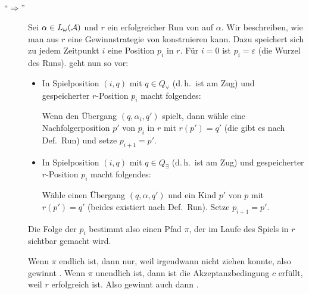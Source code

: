 \documentclass[fontsize=11pt, twoside=false, numbers=autoenddot]{scrbook}
\begin{document}
\parII
{}~
%
\begin{description}
  \item[{\boldmath "`$\Rightarrow$"'}]
    Sei $\alpha \in L_\omega(\mathcal{A})$ und $r$ ein erfolgreicher Run von \Amc auf $\alpha$.
    Wir beschreiben, wie man aus $r$ eine Gewinnstrategie von \PlE konstruieren kann.
    Dazu speichert sich \PlE zu jedem Zeitpunkt $i$ eine Position $p_i$ in $r$.
    Für $i=0$ ist $p_i = \varepsilon$ (die Wurzel des Runs).
    \PlE geht nun so vor:
    \begin{itemize}
      \item
        In Spielposition $(i,q)$ mit $q \in Q_\forall$ (d.\,h.\ \PlA ist am Zug)
        und gespeicherter $r$-Position $p_i$ macht \PlE folgendes:
        
        Wenn \PlA den Übergang $(q,\alpha_i,q')$ spielt,
        dann wähle eine Nachfolgerposition $p'$ von $p_i$ in $r$
        mit $r(p') = q'$ (die gibt es nach Def.\ Run)
        und setze $p_{i+1} = p'$.
      \item
        In Spielposition $(i,q)$ mit $q \in Q_\exists$ (d.\,h.\ \PlE ist am Zug)
        und gespeicherter $r$-Position $p_i$ macht \PlE folgendes:
        
        Wähle einen Übergang $(q,\alpha,q')$ und ein Kind $p'$ von $p$
        mit $r(p')=q'$ (beides existiert nach Def.\ Run).
        Setze $p_{i+1} = p'$.
    \end{itemize}
    Die Folge der $p_i$ bestimmt also einen Pfad $\pi$,
    der im Laufe des Spiels in $r$ sichtbar gemacht wird.
    
    Wenn $\pi$ endlich ist, dann nur, weil irgendwann \PlA nicht ziehen konnte, also gewinnt \PlE.
    Wenn $\pi$ unendlich ist, dann ist die Akzeptanzbedingung $c$ erfüllt, weil $r$ erfolgreich ist.
    Also gewinnt auch dann \PlE.
    

\end{description}
\end{document}
